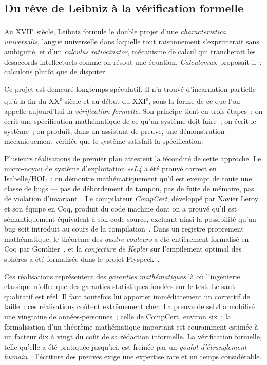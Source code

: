\documentclass[11pt,a4paper]{article}
\begin{document}
\subsection{Du rêve de Leibniz à la vérification formelle}

Au XVII\textsuperscript{e} siècle, Leibniz formule le double projet d'une \emph{characteristica universalis}, langue universelle dans laquelle tout raisonnement s'exprimerait sans ambiguïté, et d'un \emph{calculus ratiocinator}, mécanisme de calcul qui trancherait les désaccords intellectuels comme on résout une équation. \emph{Calculemus}, proposait-il~: calculons plutôt que de disputer.

Ce projet est demeuré longtemps spéculatif. Il n'a trouvé d'incarnation partielle qu'à la fin du XX\textsuperscript{e} siècle et au début du XXI\textsuperscript{e}, sous la forme de ce que l'on appelle aujourd'hui la \emph{vérification formelle}. Son principe tient en trois étapes~: on écrit une spécification mathématique de ce qu'un système doit faire~; on écrit le système~; on produit, dans un assistant de preuve, une démonstration mécaniquement vérifiée que le système satisfait la spécification.

Plusieurs réalisations de premier plan attestent la fécondité de cette approche. Le micro-noyau de système d'exploitation \emph{seL4} a été prouvé correct en Isabelle/HOL~: on démontre mathématiquement qu'il est exempt de toute une classe de bugs --- pas de débordement de tampon, pas de fuite de mémoire, pas de violation d'invariant~\parencite{klein2009sel4}. Le compilateur \emph{CompCert}, développé par Xavier Leroy et son équipe en Coq, produit du code machine dont on a prouvé qu'il est sémantiquement équivalent à son code source, excluant ainsi la possibilité qu'un bug soit introduit au cours de la compilation~\parencite{leroy2009compcert}. Dans un registre proprement mathématique, le théorème des \emph{quatre couleurs} a été entièrement formalisé en Coq par Gonthier~\parencite{gonthier2008fourcolor}, et la \emph{conjecture de Kepler} sur l'empilement optimal des sphères a été formalisée dans le projet Flyspeck~\parencite{hales2017flyspeck}.

Ces réalisations représentent des \emph{garanties mathématiques} là où l'ingénierie classique n'offre que des garanties statistiques fondées sur le test. Le saut qualitatif est réel. Il faut toutefois lui apporter immédiatement un correctif de taille~: ces réalisations coûtent extrêmement cher. La preuve de seL4 a mobilisé une vingtaine de années-personnes~; celle de CompCert, environ six~; la formalisation d'un théorème mathématique important est couramment estimée à un facteur dix à vingt du coût de sa rédaction informelle. La vérification formelle, telle qu'elle a été pratiquée jusqu'ici, est freinée par un \emph{goulot d'étranglement humain}~: l'écriture des preuves exige une expertise rare et un temps considérable.
\end{document}
